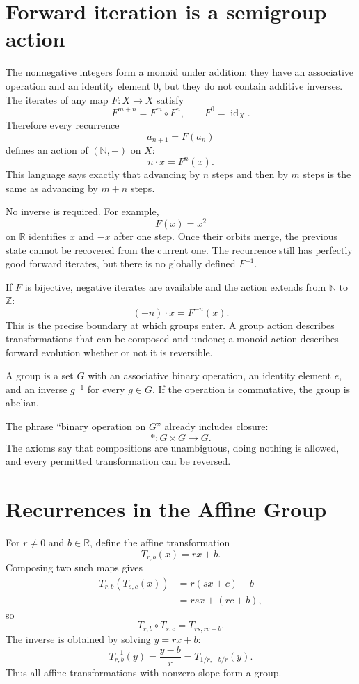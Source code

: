 \section{Forward iteration is a semigroup action}

The nonnegative integers form a monoid under addition: they have an associative operation and an identity element \(0\), but they do not contain additive inverses.  The iterates of any map \(F:X\to X\) satisfy
\[
  F^{m+n}=F^m\circ F^n,
  \qquad
  F^0=\operatorname{id}_X.
\]
Therefore every recurrence
\[
  a_{n+1}=F(a_n)
\]
defines an action of \((\mathbb N,+)\) on \(X\):
\[
  n\cdot x=F^n(x).
\]
This language says exactly that advancing by \(n\) steps and then by \(m\) steps is the same as advancing by \(m+n\) steps.

No inverse is required.  For example,
\[
  F(x)=x^2
\]
on \(\mathbb R\) identifies \(x\) and \(-x\) after one step.  Once their orbits merge, the previous state cannot be recovered from the current one.  The recurrence still has perfectly good forward iterates, but there is no globally defined \(F^{-1}\).

If \(F\) is bijective, negative iterates are available and the action extends from \(\mathbb N\) to \(\mathbb Z\):
\[
  (-n)\cdot x=F^{-n}(x).
\]
This is the precise boundary at which groups enter.  A group action describes transformations that can be composed and undone; a monoid action describes forward evolution whether or not it is reversible.

\begin{definition}[Group]
A group is a set \(G\) with an associative binary operation, an identity element \(e\), and an inverse \(g^{-1}\) for every \(g\in G\).  If the operation is commutative, the group is abelian.
\end{definition}

The phrase ``binary operation on \(G\)'' already includes closure:
\[
  *:G\times G\to G.
\]
The axioms say that compositions are unambiguous, doing nothing is allowed, and every permitted transformation can be reversed.

\section{Recurrences in the Affine Group}

For \(r\neq0\) and \(b\in\mathbb R\), define the affine transformation
\[
  T_{r,b}(x)=rx+b.
\]
Composing two such maps gives
\[
\begin{aligned}
T_{r,b}(T_{s,c}(x))
&=r(sx+c)+b\\
&=rsx+(rc+b),
\end{aligned}
\]
so
\[
  T_{r,b}\circ T_{s,c}=T_{rs,rc+b}.
\]
The inverse is obtained by solving \(y=rx+b\):
\[
  T_{r,b}^{-1}(y)=\frac{y-b}{r}
  =T_{1/r,-b/r}(y).
\]
Thus all affine transformations with nonzero slope form a group.

